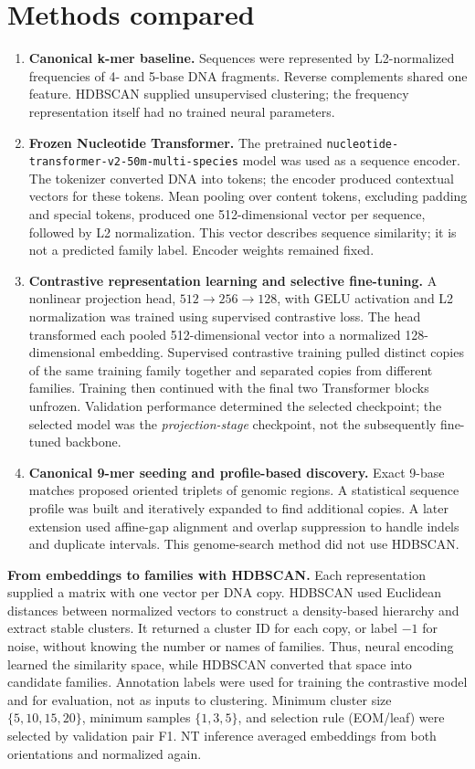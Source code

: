 \documentclass[10pt,a4paper]{article}
\begin{document}
\section*{Methods compared}
\begin{enumerate}
\item \textbf{Canonical k-mer baseline.} Sequences were represented by L2-normalized frequencies of 4- and 5-base DNA fragments. Reverse complements shared one feature. HDBSCAN supplied unsupervised clustering; the frequency representation itself had no trained neural parameters.
\item \textbf{Frozen Nucleotide Transformer.} The pretrained \texttt{nucleotide-transformer-v2-50m-multi-species} model was used as a sequence encoder. The tokenizer converted DNA into tokens; the encoder produced contextual vectors for these tokens. Mean pooling over content tokens, excluding padding and special tokens, produced one 512-dimensional vector per sequence, followed by L2 normalization. This vector describes sequence similarity; it is not a predicted family label. Encoder weights remained fixed.
\item \textbf{Contrastive representation learning and selective fine-tuning.} A nonlinear projection head, $512\!\rightarrow\!256\!\rightarrow\!128$, with GELU activation and L2 normalization was trained using supervised contrastive loss. The head transformed each pooled 512-dimensional vector into a normalized 128-dimensional embedding. Supervised contrastive training pulled distinct copies of the same training family together and separated copies from different families. Training then continued with the final two Transformer blocks unfrozen. Validation performance determined the selected checkpoint; the selected model was the \emph{projection-stage} checkpoint, not the subsequently fine-tuned backbone.
\item \textbf{Canonical 9-mer seeding and profile-based discovery.} Exact 9-base matches proposed oriented triplets of genomic regions. A statistical sequence profile was built and iteratively expanded to find additional copies. A later extension used affine-gap alignment and overlap suppression to handle indels and duplicate intervals. This genome-search method did not use HDBSCAN.
\end{enumerate}

\textbf{From embeddings to families with HDBSCAN.} Each representation supplied a matrix with one vector per DNA copy. HDBSCAN used Euclidean distances between normalized vectors to construct a density-based hierarchy and extract stable clusters. It returned a cluster ID for each copy, or label $-1$ for noise, without knowing the number or names of families. Thus, neural encoding learned the similarity space, while HDBSCAN converted that space into candidate families. Annotation labels were used for training the contrastive model and for evaluation, not as inputs to clustering. Minimum cluster size $\{5,10,15,20\}$, minimum samples $\{1,3,5\}$, and selection rule (EOM/leaf) were selected by validation pair F1. NT inference averaged embeddings from both orientations and normalized again.
\end{document}
